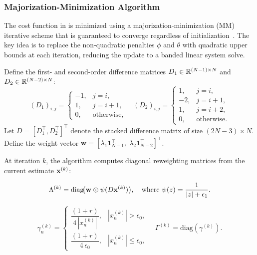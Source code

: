 \subsubsection{Majorization-Minimization Algorithm}

The cost function in  is minimized using a majorization-minimization (MM) iterative scheme that is guaranteed to converge regardless of initialization~\cite{ning2014beads}. The key idea is to replace the non-quadratic penalties $\phi$ and $\theta$ with quadratic upper bounds at each iteration, reducing the update to a banded linear system solve.

Define the first- and second-order difference matrices $D_1 \in {\mathbb R}^{(N-1) \times N}$ and $D_2 \in {\mathbb R}^{(N-2) \times N}$:
\begin{equation}
    (D_1)_{i,j} = \begin{cases} -1, & j = i, \\ 1, & j = i+1, \\ 0, & \text{otherwise}, \end{cases}
    \quad
    (D_2)_{i,j} = \begin{cases} 1, & j = i, \\ -2, & j = i+1, \\ 1, & j = i+2, \\ 0, & \text{otherwise}. \end{cases}
    \label{eq:diff_matrices}
\end{equation}
Let $D = [D_1^\top, D_2^\top]^\top$ denote the stacked difference matrix of size $(2N-3) \times N$. Define the weight vector $\mathbf{w} = [\lambda_1 \mathbf{1}_{N-1}^\top,\; \lambda_2 \mathbf{1}_{N-2}^\top]^\top$.

At iteration $k$, the algorithm computes diagonal reweighting matrices from the current estimate $\mathbf{x}^{(k)}$:

\begin{equation}
    \Lambda^{(k)} = \text{diag}\!\big(\mathbf{w} \odot \psi(D\mathbf{x}^{(k)})\big),
    \quad \text{where } \psi(z) = \frac{1}{|z| + \epsilon_1}.
    \label{eq:lambda_reweight}
\end{equation}

\begin{equation}
    \gamma_n^{(k)} = \begin{cases}
        \dfrac{(1+r)}{4\,|x_n^{(k)}|}, & |x_n^{(k)}| > \epsilon_0, \\[6pt]
        \dfrac{(1+r)}{4\,\epsilon_0}, & |x_n^{(k)}| \leq \epsilon_0,
    \end{cases}
    \quad \Gamma^{(k)} = \text{diag}(\gamma^{(k)}).
    \label{eq:gamma_reweight}
\end{equation}


